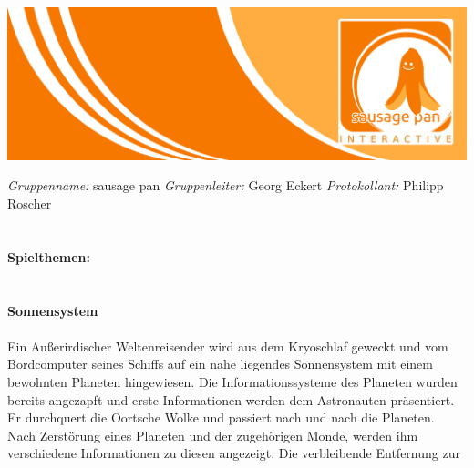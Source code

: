 \documentclass[10pt,a4paper,notitlepage]{report}
\author{Sausage Pan}
\begin{document}
	\newcommand{\Eins}[1]{\color{orange}\textbf{{\Large#1}}} %
	\newcommand{\Zwei}[1]{\color{orange}\textbf{{\large#1}}} %
	\newcommand{\Drei}[1]{\color{orange}{\normalsize#1}} %
	\newcommand{\Text}{\color{schwarz}} %
	\newcommand{\Fusszeile}
	{\textit{{\footnotesize Eckert, Georg - Roscher, Philipp - Krien, Alexandra - Sinakov, Sergej - Blasberg, Bettina - Groß, Stephanie Sara}}} %
	\marginpar{\vspace{3.0mm} \color{orange}\rule{0.8mm}{53.3mm} \\[3mm] \color{hellorange}\rule{0.8mm}{170mm}}
	\begin{center}
		\includegraphics[width=160mm]{header2}
	\end{center}
	\color{orange} \textit{Gruppenname:} \color{schwarz}sausage pan \color{orange} \textit{Gruppenleiter:} \color{schwarz}Georg Eckert   \color{orange} \textit{Protokollant:} \color{schwarz}Philipp Roscher\\
	\\
	\\
	\Eins{Spielthemen:}\\
	\\
	\\
	\Zwei{Sonnensystem}\\
	\\
	\Text
		Ein Außerirdischer Weltenreisender wird aus dem Kryoschlaf geweckt und vom
	Bordcomputer seines Schiffs auf ein nahe liegendes Sonnensystem mit einem
	bewohnten Planeten hingewiesen. Die Informationssysteme des Planeten wurden
	bereits angezapft und erste Informationen werden dem Astronauten präsentiert.
	Er durchquert die Oortsche Wolke und passiert nach und nach die Planeten.
	Nach Zerstörung eines Planeten und der zugehörigen Monde, werden ihm
	verschiedene Informationen zu diesen angezeigt. Die verbleibende Entfernung zur
\end{document}
